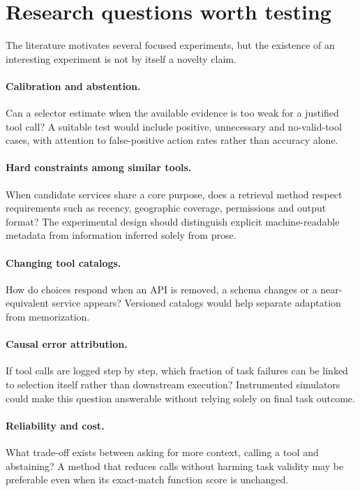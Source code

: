 \documentclass[10pt,a4paper]{article}
\begin{document}
\section{Research questions worth testing}
The literature motivates several focused experiments, but the existence of an interesting experiment is not by itself a novelty claim.

\paragraph{Calibration and abstention.} Can a selector estimate when the available evidence is too weak for a justified tool call? A suitable test would include positive, unnecessary and no-valid-tool cases, with attention to false-positive action rates rather than accuracy alone.

\paragraph{Hard constraints among similar tools.} When candidate services share a core purpose, does a retrieval method respect requirements such as recency, geographic coverage, permissions and output format? The experimental design should distinguish explicit machine-readable metadata from information inferred solely from prose.

\paragraph{Changing tool catalogs.} How do choices respond when an API is removed, a schema changes or a near-equivalent service appears? Versioned catalogs would help separate adaptation from memorization.

\paragraph{Causal error attribution.} If tool calls are logged step by step, which fraction of task failures can be linked to selection itself rather than downstream execution? Instrumented simulators could make this question answerable without relying solely on final task outcome.

\paragraph{Reliability and cost.} What trade-off exists between asking for more context, calling a tool and abstaining? A method that reduces calls without harming task validity may be preferable even when its exact-match function score is unchanged.
\end{document}
